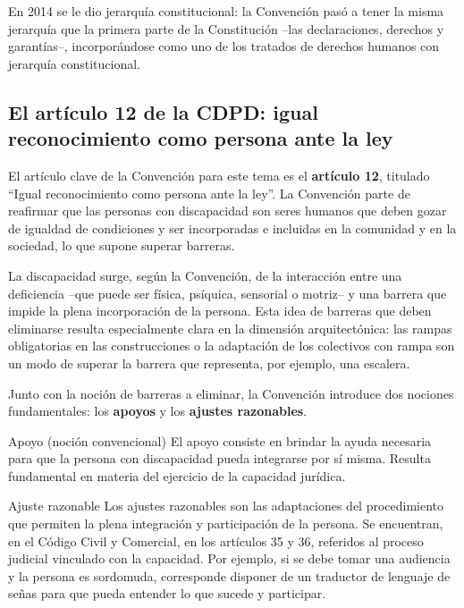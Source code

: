 \documentclass[12pt,oneside]{book}
\begin{document}
En 2014 se le dio jerarquía constitucional: la Convención pasó a tener la misma jerarquía que la primera parte de la Constitución --las declaraciones, derechos y garantías--, incorporándose como uno de los tratados de derechos humanos con jerarquía constitucional.

\subsection{El artículo 12 de la CDPD: igual reconocimiento como persona ante la ley}

El artículo clave de la Convención para este tema es el \textbf{artículo 12}, titulado ``Igual reconocimiento como persona ante la ley''. La Convención parte de reafirmar que las personas con discapacidad son seres humanos que deben gozar de igualdad de condiciones y ser incorporadas e incluidas en la comunidad y en la sociedad, lo que supone superar barreras.

La discapacidad surge, según la Convención, de la interacción entre una deficiencia --que puede ser física, psíquica, sensorial o motriz-- y una barrera que impide la plena incorporación de la persona. Esta idea de barreras que deben eliminarse resulta especialmente clara en la dimensión arquitectónica: las rampas obligatorias en las construcciones o la adaptación de los colectivos con rampa son un modo de superar la barrera que representa, por ejemplo, una escalera.

Junto con la noción de barreras a eliminar, la Convención introduce dos nociones fundamentales: los \textbf{apoyos} y los \textbf{ajustes razonables}.

\begin{definition}{Apoyo (noción convencional)}
El apoyo consiste en brindar la ayuda necesaria para que la persona con discapacidad pueda integrarse por sí misma. Resulta fundamental en materia del ejercicio de la capacidad jurídica.
\end{definition}

\begin{definition}{Ajuste razonable}
Los ajustes razonables son las adaptaciones del procedimiento que permiten la plena integración y participación de la persona. Se encuentran, en el Código Civil y Comercial, en los artículos 35 y 36, referidos al proceso judicial vinculado con la capacidad. Por ejemplo, si se debe tomar una audiencia y la persona es sordomuda, corresponde disponer de un traductor de lenguaje de señas para que pueda entender lo que sucede y participar.
\end{definition}
\end{document}
